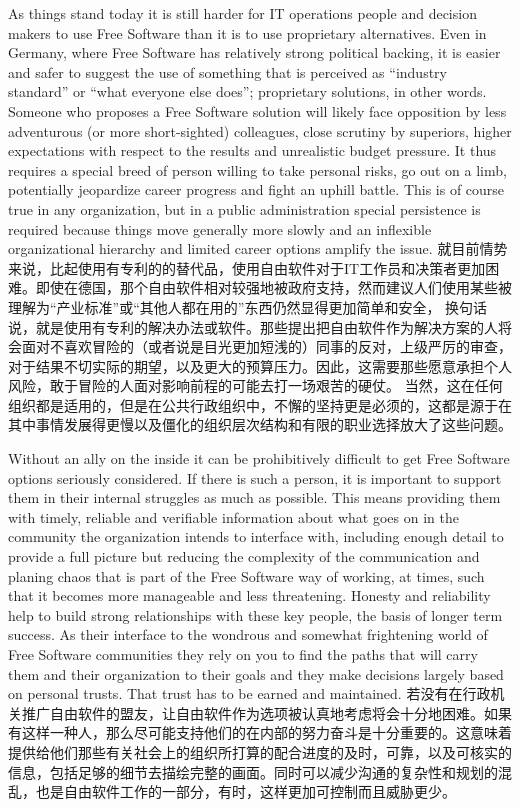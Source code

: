 As things stand today it is still harder for IT operations people and decision
makers to use Free Software than it is to use proprietary alternatives. Even in
Germany, where Free Software has relatively strong political backing, it is
easier and safer to suggest the use of something that is perceived as ``industry
standard'' or ``what everyone else does''; proprietary solutions, in other words.
Someone who proposes a Free Software solution will likely face opposition by
less adventurous (or more short-sighted) colleagues, close scrutiny by
superiors, higher expectations with respect to the results and unrealistic
budget pressure. It thus requires a special breed of person willing to take
personal risks, go out on a limb, potentially jeopardize career progress and
fight an uphill battle. This is of course true in any organization, but in a
public administration special persistence is required because things move
generally more slowly and an inflexible organizational hierarchy and limited
career options amplify the issue.
就目前情势来说，比起使用有专利的的替代品，使用自由软件对于IT工作员和决策者更加困难。即使在德国，那个自由软件相对较强地被政府支持，然而建议人们使用某些被理解为“产业标准”或“其他人都在用的”东西仍然显得更加简单和安全，
换句话说，就是使用有专利的解决办法或软件。那些提出把自由软件作为解决方案的人将会面对不喜欢冒险的（或者说是目光更加短浅的）同事的反对，上级严厉的审查，对于结果不切实际的期望，以及更大的预算压力。因此，这需要那些愿意承担个人风险，敢于冒险的人面对影响前程的可能去打一场艰苦的硬仗。
当然，这在任何组织都是适用的，但是在公共行政组织中，不懈的坚持更是必须的，这都是源于在其中事情发展得更慢以及僵化的组织层次结构和有限的职业选择放大了这些问题。

Without an ally on the inside it can be prohibitively difficult to get
Free Software options seriously considered. If there is such a person, it is important
to support them in their internal struggles as much as possible. This
means providing them with timely, reliable and verifiable information about
what goes on in the community the organization intends to interface with,
including enough detail to provide a full picture but reducing the
complexity of the communication and planing chaos that is part of the Free
Software way of working, at times, such that it becomes more manageable and
less threatening. Honesty and reliability help to build strong
relationships with these key people, the basis of longer term success. As
their interface to the wondrous and somewhat frightening world of Free
Software communities they rely on you to find the paths that will carry
them and their organization to their goals and they make decisions largely
based on personal trusts. That trust has to be earned and maintained.
若没有在行政机关推广自由软件的盟友，让自由软件作为选项被认真地考虑将会十分地困难。如果有这样一种人，那么尽可能支持他们的在内部的努力奋斗是十分重要的。这意味着提供给他们那些有关社会上的组织所打算的配合进度的及时，可靠，以及可核实的信息，包括足够的细节去描绘完整的画面。同时可以减少沟通的复杂性和规划的混乱，也是自由软件工作的一部分，有时，这样更加可控制而且威胁更少。

